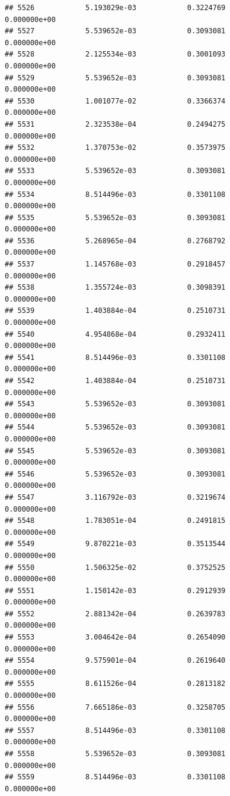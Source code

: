 \documentclass[
]{article}
\begin{document}
\begin{verbatim}
## 5526            5.193029e-03            0.3224769            0.000000e+00
## 5527            5.539652e-03            0.3093081            0.000000e+00
## 5528            2.125534e-03            0.3001093            0.000000e+00
## 5529            5.539652e-03            0.3093081            0.000000e+00
## 5530            1.001077e-02            0.3366374            0.000000e+00
## 5531            2.323538e-04            0.2494275            0.000000e+00
## 5532            1.370753e-02            0.3573975            0.000000e+00
## 5533            5.539652e-03            0.3093081            0.000000e+00
## 5534            8.514496e-03            0.3301108            0.000000e+00
## 5535            5.539652e-03            0.3093081            0.000000e+00
## 5536            5.268965e-04            0.2768792            0.000000e+00
## 5537            1.145768e-03            0.2918457            0.000000e+00
## 5538            1.355724e-03            0.3098391            0.000000e+00
## 5539            1.403884e-04            0.2510731            0.000000e+00
## 5540            4.954868e-04            0.2932411            0.000000e+00
## 5541            8.514496e-03            0.3301108            0.000000e+00
## 5542            1.403884e-04            0.2510731            0.000000e+00
## 5543            5.539652e-03            0.3093081            0.000000e+00
## 5544            5.539652e-03            0.3093081            0.000000e+00
## 5545            5.539652e-03            0.3093081            0.000000e+00
## 5546            5.539652e-03            0.3093081            0.000000e+00
## 5547            3.116792e-03            0.3219674            0.000000e+00
## 5548            1.783051e-04            0.2491815            0.000000e+00
## 5549            9.870221e-03            0.3513544            0.000000e+00
## 5550            1.506325e-02            0.3752525            0.000000e+00
## 5551            1.150142e-03            0.2912939            0.000000e+00
## 5552            2.881342e-04            0.2639783            0.000000e+00
## 5553            3.004642e-04            0.2654090            0.000000e+00
## 5554            9.575901e-04            0.2619640            0.000000e+00
## 5555            8.611526e-04            0.2813182            0.000000e+00
## 5556            7.665186e-03            0.3258705            0.000000e+00
## 5557            8.514496e-03            0.3301108            0.000000e+00
## 5558            5.539652e-03            0.3093081            0.000000e+00
## 5559            8.514496e-03            0.3301108            0.000000e+00

\end{verbatim}
\end{document}
